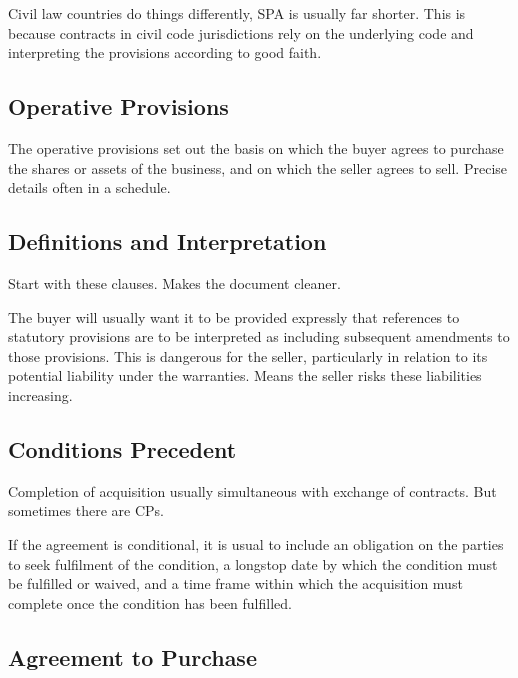 \documentclass[
]{article}
\begin{document}
Civil law countries do things differently, SPA is usually far shorter.
This is because contracts in civil code jurisdictions rely on the
underlying code and interpreting the provisions according to good faith.

\hypertarget{operative-provisions}{%
\subsection{Operative Provisions}\label{operative-provisions}}

The operative provisions set out the basis on which the buyer agrees to
purchase the shares or assets of the business, and on which the seller
agrees to sell. Precise details often in a schedule.

\hypertarget{definitions-and-interpretation}{%
\subsection{Definitions and
Interpretation}\label{definitions-and-interpretation}}

Start with these clauses. Makes the document cleaner.

The buyer will usually want it to be provided expressly that references
to statutory provisions are to be interpreted as including subsequent
amendments to those provisions. This is dangerous for the seller,
particularly in relation to its potential liability under the
warranties. Means the seller risks these liabilities increasing.

\hypertarget{conditions-precedent}{%
\subsection{Conditions Precedent}\label{conditions-precedent}}

Completion of acquisition usually simultaneous with exchange of
contracts. But sometimes there are CPs.

If the agreement is conditional, it is usual to include an obligation on
the parties to seek fulfilment of the condition, a longstop date by
which the condition must be fulfilled or waived, and a time frame within
which the acquisition must complete once the condition has been
fulfilled.

\hypertarget{agreement-to-purchase}{%
\subsection{Agreement to Purchase}\label{agreement-to-purchase}}
\end{document}
